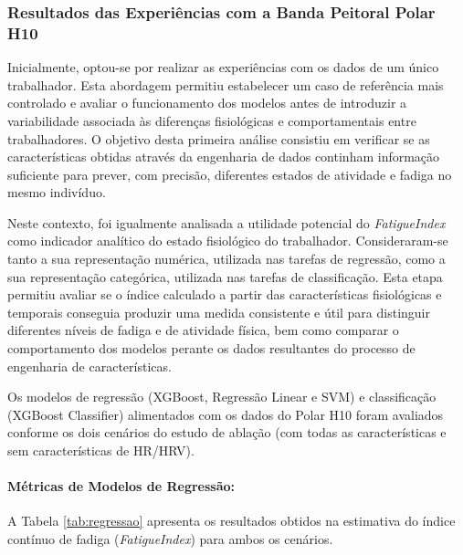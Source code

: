 \subsubsection*{Resultados das Experiências com a Banda Peitoral Polar H10}

Inicialmente, optou-se por realizar as experiências com os dados de um único trabalhador. Esta abordagem permitiu estabelecer um caso de referência mais controlado e avaliar o funcionamento dos modelos antes de introduzir a variabilidade associada às diferenças fisiológicas e comportamentais entre trabalhadores. O objetivo desta primeira análise consistiu em verificar se as características obtidas através da engenharia de dados continham informação suficiente para prever, com precisão, diferentes estados de atividade e fadiga no mesmo indivíduo.

Neste contexto, foi igualmente analisada a utilidade potencial do \textit{FatigueIndex} como indicador analítico do estado fisiológico do trabalhador. Consideraram-se tanto a sua representação numérica, utilizada nas tarefas de regressão, como a sua representação categórica, utilizada nas tarefas de classificação. Esta etapa permitiu avaliar se o índice calculado a partir das características fisiológicas e temporais conseguia produzir uma medida consistente e útil para distinguir diferentes níveis de fadiga e de atividade física, bem como comparar o comportamento dos modelos perante os dados resultantes do processo de engenharia de características.

Os modelos de regressão (XGBoost, Regressão Linear e SVM) e classificação (XGBoost Classifier) alimentados com os dados do Polar H10 foram avaliados conforme os dois cenários do estudo de ablação (com todas as características e sem características de HR/HRV).

\paragraph{Métricas de Modelos de Regressão:}
\mbox{}\par

A Tabela \ref{tab:regressao} apresenta os resultados obtidos na estimativa do índice contínuo de fadiga (\textit{FatigueIndex}) para ambos os cenários.

